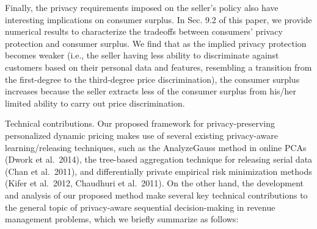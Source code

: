 Finally, the privacy requirements imposed on the seller's policy also have interesting implications on consumer surplus. In Sec. 9.2 of this paper, we provide numerical results to characterize the tradeoffs between consumers' privacy protection and consumer surplus. We find that as the implied privacy protection becomes weaker (i.e., the seller having less ability to discriminate against customers based on their personal data and features, resembling a transition from the first-degree to the third-degree price discrimination), the consumer surplus increases because the seller extracts less of the consumer surplus from his/her limited ability to carry out price discrimination.

Technical contributions. Our proposed framework for privacy-preserving personalized dynamic pricing makes use of several existing privacy-aware learning/releasing techniques, such as the AnalyzeGauss method in online PCAs (Dwork et al.~2014), the tree-based aggregation technique for releasing serial data (Chan et al.~2011), and differentially private empirical risk minimization methods (Kifer et al.~2012, Chaudhuri et al.~2011). On the other hand, the development and analysis of our proposed method make several key technical contributions to the general topic of privacy-aware sequential decision-making in revenue management problems, which we briefly summarize as follows:

